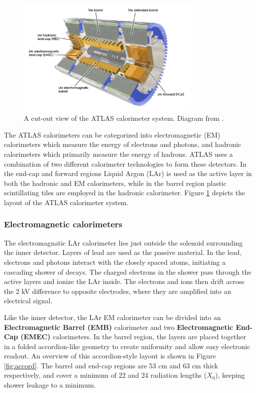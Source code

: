 \begin{figure}[H]
    \centering
    \includegraphics[width=0.8\textwidth]{Figures/2/Calo.png}
    \caption{A cut-out view of the ATLAS calorimeter system. Diagram from \cite{ATLASDesign}.}
    \label{fig:atlascalo}
\end{figure}

The ATLAS calorimeters can be categorized into electromagnetic (EM) calorimeters which measure the energy of electrons and photons, and hadronic calorimeters which primarily measure the energy of hadrons. ATLAS uses a combination of two different calorimeter technologies to form these detectors. In the end-cap and forward regions Liquid Argon (LAr) is used as the active layer in both the hadronic and EM calorimeters, while in the barrel region plastic scintillating tiles are employed in the hadronic calorimeter. Figure \ref{fig:atlascalo} depicts the layout of the ATLAS calorimeter system.

\subsubsection{Electromagnetic calorimeters}
The electromagnatic LAr calorimeter lies just outside the solenoid surrounding the inner detector. Layers of lead are used as the passive material. In the lead, electrons and photons interact with the closely spaced atoms, initiating a cascading shower of decays. The charged electrons in the shower pass through the active layers and ionize the LAr inside. The electrons and ions then drift across the 2 kV difference to opposite electrodes, where they are amplified into an electrical signal.

Like the inner detector, the LAr EM calorimeter can be divided into an \textbf{Electromagnetic Barrel (EMB)} calorimeter and two \textbf{Electromagnetic End-Cap (EMEC)} calorimeters. In the barrel region, the layers are placed together in a folded accordion-like geometry to create uniformity and allow easy electronic readout. An overview of this accordion-style layout is shown in Figure \ref{fig:accord}. The barrel and end-cap regions are 53 cm and 63 cm thick respectively, and cover a minimum of 22 and 24 radiation lengths ($X_0$), keeping shower leakage to a minimum.

